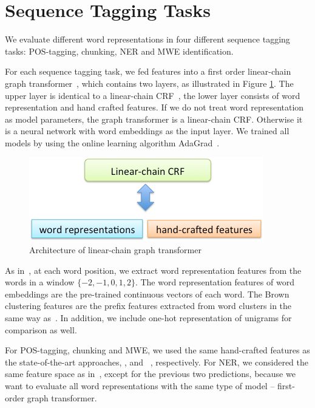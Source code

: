 \section{Sequence Tagging Tasks}
\label{sec:SeqTagging}
We evaluate different word representations in four different sequence tagging tasks: POS-tagging, chunking, NER and MWE identification. 

For each sequence tagging task, we fed features into a first order linear-chain graph
transformer~\cite{collobert2011natural}, which contains two layers, as illustrated in Figure \ref{fig:graph_transformer}. The upper layer is identical to a linear-chain CRF~\cite{lafferty2001conditional}, the lower layer consists of word representation and hand crafted features. If we do not treat word representation as model parameters, the graph transformer is a linear-chain CRF. Otherwise it is a neural network with word embeddings as the input layer. We trained all models by using the online learning algorithm AdaGrad~\cite{duchi2011adaptive}. 

\begin{figure}[hb]
  \centering
  \includegraphics[scale = 0.3]{images/graph_transformer.png}
  \caption{Architecture of linear-chain graph transformer}
  \label{fig:graph_transformer}
\end{figure}


As in~\cite{turian2010word}, at each word position, we extract word representation features from the words in a window $\{-2, -1, 0, 1, 2\}$. The word representation features of word embeddings are the pre-trained continuous vectors of each word.  The Brown clustering features are the prefix features extracted from word clusters in the same way as~\cite{turian2010word}. In addition, we include one-hot representation of unigrams for comparison as well.

For POS-tagging, chunking and MWE, we used the same hand-crafted features as the state-of-the-art approaches,  ,  and ~, respectively. For NER, we considered the same feature space as in~\cite{turian2010word}, except for the previous two predictions, because we want to evaluate all word representations with the same type of model -- first-order graph transformer.

